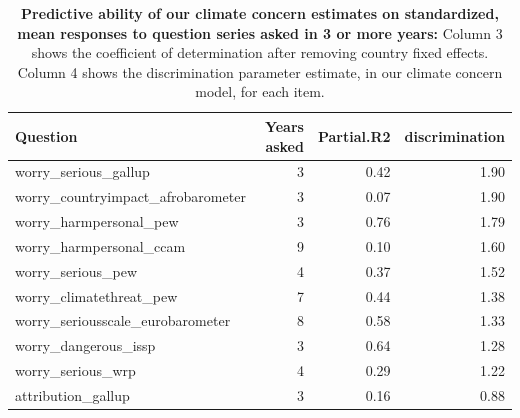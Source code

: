 \begin{table}[ht]
\centering
\begin{tabular}{lrrr}
  \hline
Question & Years asked & Partial.R2 & discrimination \\ 
  \hline
worry\_serious\_gallup &   3 & 0.42 & 1.90 \\ 
  worry\_countryimpact\_afrobarometer &   3 & 0.07 & 1.90 \\ 
  worry\_harmpersonal\_pew &   3 & 0.76 & 1.79 \\ 
  worry\_harmpersonal\_ccam &   9 & 0.10 & 1.60 \\ 
  worry\_serious\_pew &   4 & 0.37 & 1.52 \\ 
  worry\_climatethreat\_pew &   7 & 0.44 & 1.38 \\ 
  worry\_seriousscale\_eurobarometer &   8 & 0.58 & 1.33 \\ 
  worry\_dangerous\_issp &   3 & 0.64 & 1.28 \\ 
  worry\_serious\_wrp &   4 & 0.29 & 1.22 \\ 
  attribution\_gallup &   3 & 0.16 & 0.88 \\ 
   \hline
\end{tabular}
\caption{{\bf Predictive ability of our climate concern estimates on standardized, mean responses to question series asked in 3 or more years: } Column 3 shows the coefficient of determination after removing country fixed effects. Column 4 shows the discrimination parameter estimate, in our climate concern model, for each item.} 
\label{tab:timeseries}
\end{table}
